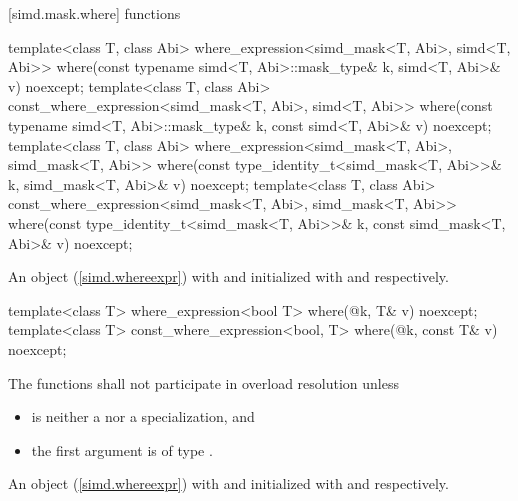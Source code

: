 [simd.mask.where]{ functions}

\begin{itemdecl}
template<class T, class Abi>
  where_expression<simd_mask<T, Abi>, simd<T, Abi>>
    where(const typename simd<T, Abi>::mask_type& k, simd<T, Abi>& v) noexcept;
template<class T, class Abi>
  const_where_expression<simd_mask<T, Abi>, simd<T, Abi>>
    where(const typename simd<T, Abi>::mask_type& k, const simd<T, Abi>& v) noexcept;
template<class T, class Abi>
  where_expression<simd_mask<T, Abi>, simd_mask<T, Abi>>
    where(const type_identity_t<simd_mask<T, Abi>>& k, simd_mask<T, Abi>& v) noexcept;
template<class T, class Abi>
  const_where_expression<simd_mask<T, Abi>, simd_mask<T, Abi>>
    where(const type_identity_t<simd_mask<T, Abi>>& k, const simd_mask<T, Abi>& v) noexcept;
\end{itemdecl}

\begin{itemdescr}
  \pnum\returns
  An object (\ref{simd.whereexpr}) with  and  initialized with  and  respectively.
\end{itemdescr}

\begin{itemdecl}
template<class T>
  where_expression<bool T>
    where(@\seebelow@ k, T& v) noexcept;
template<class T>
  const_where_expression<bool, T>
    where(@\seebelow@ k, const T& v) noexcept;
\end{itemdecl}

\begin{itemdescr}
  \pnum\remarks
  The functions shall not participate in overload resolution unless

  \begin{itemize}
    \item {} is neither a  nor a  specialization, and
    \item the first argument is of type .
  \end{itemize}

  \pnum\returns
  An object (\ref{simd.whereexpr}) with  and  initialized with  and  respectively.
\end{itemdescr}


